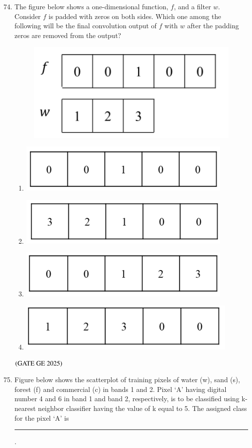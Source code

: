 \documentclass[journal,12pt,onecolumn]{IEEEtran}
\theoremstyle{remark}
\begin{document}
\begin{enumerate}
\setcounter{enumi}{73}
\item The figure below shows a one-dimensional function, $f$, and a filter $w$. Consider $f$ is padded with zeros on both sides. Which one among the following will be the final convolution output of $f$ with $w$ after the padding zeros are removed from the output?
\begin{figure}[H]
    \centering
    \includegraphics[width=0.4\columnwidth]{figs/fig12.png}
    \caption{}
    \label{figs:fig12}
\end{figure}
\begin{enumerate}
\item \includegraphics[width=0.4\columnwidth]{figs/fig15.png}
\item \includegraphics[width=0.4\columnwidth]{figs/fig16.png}
\item \includegraphics[width=0.4\columnwidth]{figs/fig17.png}
\item \includegraphics[width=0.4\columnwidth]{figs/fig18.png}
\end{enumerate}
\hfill $\left(\text{GATE GE 2025}\right)$
\bigskip
\item Figure below shows the scatterplot of training pixels of water (w), sand (s), forest (f) and commercial (c) in bands 1 and 2. Pixel ‘A’ having digital number 4 and 6 in band 1 and band 2, respectively, is to be classified using k-nearest neighbor classifier having the value of k equal to 5. The assigned class for the pixel ‘A’ is \rule{2cm}{0.5mm}.

\end{enumerate}
\end{document}
